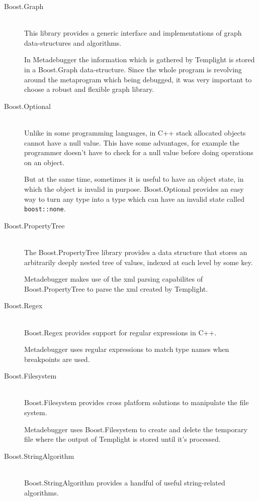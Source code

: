 \begin{description}
    \item[Boost.Graph] \hfill \\
        This library provides a generic interface and implementations of graph
        data-structures and algorithms.

        In Metadebugger the information which is gathered by Templight is
        stored in a Boost.Graph data-structure. Since the whole program is
        revolving around the metaprogram which being debugged, it was very
        important to choose a robust and flexible graph library.
    \item[Boost.Optional] \hfill \\
        Unlike in some programming languages, in C++ stack allocated objects
        cannot have a null value. This have some advantages, for example the
        programmer doesn't have to check for a null value before doing
        operations on an object.

        But at the same time, sometimes it is useful to have an object state,
        in which the object is invalid in purpose. Boost.Optional provides an
        easy way to turn any type into a type which can have an invalid state
        called \lstinline[language=C++]|boost::none|.
    \item[Boost.PropertyTree] \hfill \\
        The Boost.PropertyTree library provides a data structure that stores an
        arbitrarily deeply nested tree of values, indexed at each level by some
        key.

        Metadebugger makes use of the xml parsing capabilites of
        Boost.PropertyTree to parse the xml created by Templight.
    \item[Boost.Regex] \hfill \\
        Boost.Regex provides support for regular expressions in C++.

        Metadebugger uses regular expressions to match type names when
        breakpoints are used.
    \item[Boost.Filesystem] \hfill \\
        Boost.Filesystem provides cross platform solutions to manipulate the
        file system.

        Metadebugger uses Boost.Filesystem to create and delete the temporary
        file where the output of Templight is stored until it's processed.
    \item[Boost.StringAlgorithm] \hfill \\
        Boost.StringAlgorithm provides a handful of useful string-related
        algorithms.


\end{description}
